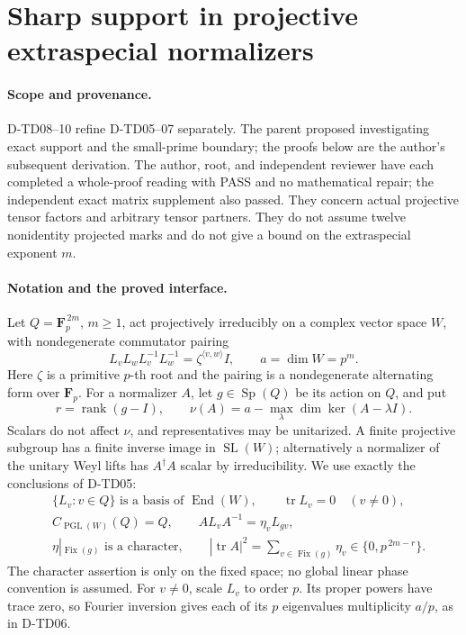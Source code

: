 \section{Sharp support in projective extraspecial normalizers}
\label{sec:extraspecial-sharp-support}

\paragraph{Scope and provenance.}
D-TD08--10 refine D-TD05--07 separately.  The parent proposed investigating
exact support and the small-prime boundary; the proofs below are the
author's subsequent derivation. The author, root, and independent reviewer have each completed a whole-proof reading with PASS and no mathematical repair; the independent exact matrix supplement also passed.  They concern actual projective tensor factors and arbitrary
tensor partners.  They do not assume twelve nonidentity projected marks
and do not give a bound on the extraspecial exponent \(m\).

\paragraph{Notation and the proved interface.}
Let \(Q=\mathbf F_p^{\,2m}\), \(m\ge1\), act projectively irreducibly on
a complex vector space \(W\), with nondegenerate commutator pairing
\[
 L_vL_wL_v^{-1}L_w^{-1}
       =\zeta^{\langle v,w\rangle}I,\qquad a=\dim W=p^m.
 \tag{TDS.1}
\]
Here \(\zeta\) is a primitive \(p\)-th root and the pairing is a
nondegenerate alternating form over \(\mathbf F_p\).  For a normalizer
\(A\), let \(g\in\operatorname{Sp}(Q)\) be its action on \(Q\), and put
\[
 r=\operatorname{rank}(g-I),\qquad
 \nu(A)=a-\max_\lambda\dim\ker(A-\lambda I).
 \tag{TDS.2}
\]
Scalars do not affect \(\nu\), and representatives may be unitarized.
A finite projective subgroup has a finite inverse image in
\(\operatorname{SL}(W)\); alternatively a normalizer of the unitary
Weyl lifts has \(A^\dagger A\) scalar by irreducibility.
We use exactly the conclusions of D-TD05:
\[
 \begin{split}
 &\{L_v:v\in Q\}\text{ is a basis of }\operatorname{End}(W),\qquad
   \operatorname{tr}L_v=0\quad(v\ne0),\\
 &C_{\operatorname{PGL}(W)}(Q)=Q,\qquad
 A L_v A^{-1}=\eta_vL_{gv},\\
 &\eta|_{\operatorname{Fix}(g)}\text{ is a character},\qquad
 |\operatorname{tr}A|^2
    =\sum_{v\in\operatorname{Fix}(g)}\eta_v
    \in\{0,p^{\,2m-r}\}.
 \end{split}
 \tag{TDS.3}
\]
The character assertion is only on the fixed space; no global linear
phase convention is assumed.  For \(v\ne0\), scale \(L_v\) to order
\(p\).  Its proper powers have trace zero, so Fourier inversion gives
each of its \(p\) eigenvalues multiplicity \(a/p\), as in D-TD06.

